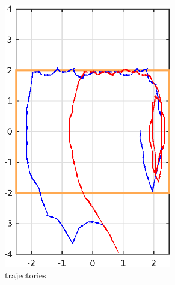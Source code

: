 \begin{figure}
\begin{subfigure}[b]{0.235\textwidth}
		\includegraphics[width=0.8\textwidth]{pic/traj}
		\caption{trajectories}
		\label{fig:traj}
	\end{subfigure}
	\begin{subfigure}[b]{0.5\textwidth}
		

\end{subfigure}
\end{figure}
